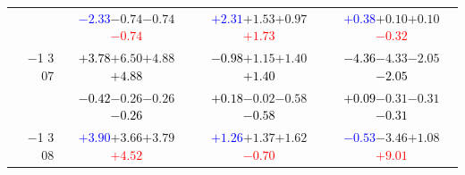 \documentclass[compress]{beamer}
\begin{document}
\begin{frame}
\begin{tabular}{r | c | c | c}
          & \textcolor{blue}{$-2.33$}\hspace{0.1 cm}$-0.74$\hspace{0.1 cm}$-0.74$\hspace{0.1 cm}\textcolor{red}{$-0.74$} & \textcolor{blue}{$+2.31$}\hspace{0.1 cm}$+1.53$\hspace{0.1 cm}$+0.97$\hspace{0.1 cm}\textcolor{red}{$+1.73$} & \textcolor{blue}{$+0.38$}\hspace{0.1 cm}$+0.10$\hspace{0.1 cm}$+0.10$\hspace{0.1 cm}\textcolor{red}{$-0.32$} \\
$-$1 3 07 & \textcolor{black}{$+3.78$}\hspace{0.1 cm}$+6.50$\hspace{0.1 cm}$+4.88$\hspace{0.1 cm}\textcolor{black}{$+4.88$} & \textcolor{black}{$-0.98$}\hspace{0.1 cm}$+1.15$\hspace{0.1 cm}$+1.40$\hspace{0.1 cm}\textcolor{black}{$+1.40$} & \textcolor{black}{$-4.36$}\hspace{0.1 cm}$-4.33$\hspace{0.1 cm}$-2.05$\hspace{0.1 cm}\textcolor{black}{$-2.05$} \\
          & \textcolor{black}{$-0.42$}\hspace{0.1 cm}$-0.26$\hspace{0.1 cm}$-0.26$\hspace{0.1 cm}\textcolor{black}{$-0.26$} & \textcolor{black}{$+0.18$}\hspace{0.1 cm}$-0.02$\hspace{0.1 cm}$-0.58$\hspace{0.1 cm}\textcolor{black}{$-0.58$} & \textcolor{black}{$+0.09$}\hspace{0.1 cm}$-0.31$\hspace{0.1 cm}$-0.31$\hspace{0.1 cm}\textcolor{black}{$-0.31$} \\
$-$1 3 08 & \textcolor{blue}{$+3.90$}\hspace{0.1 cm}$+3.66$\hspace{0.1 cm}$+3.79$\hspace{0.1 cm}\textcolor{red}{$+4.52$} & \textcolor{blue}{$+1.26$}\hspace{0.1 cm}$+1.37$\hspace{0.1 cm}$+1.62$\hspace{0.1 cm}\textcolor{red}{$-0.70$} & \textcolor{blue}{$-0.53$}\hspace{0.1 cm}$-3.46$\hspace{0.1 cm}$+1.08$\hspace{0.1 cm}\textcolor{red}{$+9.01$} \\

\end{tabular}
\end{frame}
\end{document}
